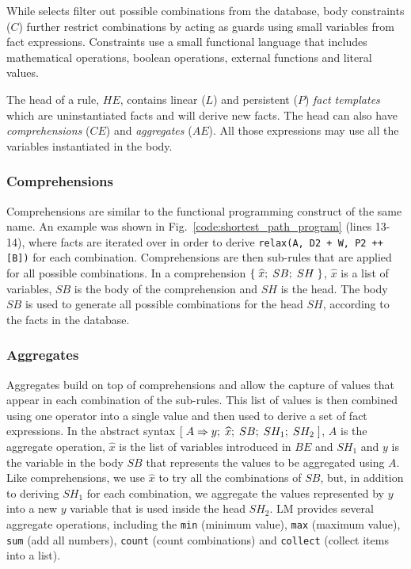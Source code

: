 While selects filter out possible combinations from the database,
body constraints ($C$) further restrict combinations by acting as guards using
small variables from fact expressions. Constraints use a small
functional language that includes mathematical
operations, boolean operations, external functions and literal values.

The head of a rule, $HE$, contains linear ($L$) and persistent ($P$) \emph{fact
   templates} which are uninstantiated facts and will derive new facts. The head
   can also have \emph{comprehensions} ($CE$) and \emph{aggregates} ($AE$). All
   those expressions may use all the variables instantiated in the body.

\subsubsection{Comprehensions}

Comprehensions are similar to the functional programming construct of the same
name. An example was shown in Fig.~\ref{code:shortest_path_program} (lines
      13-14), where  facts are iterated over in order
to derive \texttt{relax(A, D2 + W, P2 ++ [B])} for each combination.
Comprehensions are then sub-rules that are applied for all possible
combinations. In a comprehension $\{ \; \widehat{x}; \; SB; \; SH \; \}$,
$\widehat{x}$ is a list of variables, $SB$ is the body of the comprehension and
$SH$ is the head. The body $SB$ is used to generate all possible combinations
for the head $SH$, according to the facts in the database.

\subsubsection{Aggregates}

Aggregates build on top of comprehensions and allow the capture of values that
appear in each combination of the sub-rules. This list of values is then
combined using one operator into a single value and then used to derive a set of
fact expressions. In the abstract syntax
$[\; A \Rightarrow y; \; \widehat{x}; \; SB; \; SH_1; \; SH_2 \;]$, $A$ is the aggregate operation,
$\widehat{x}$ is the list of variables introduced in $BE$ and $SH_1$ and $y$ is
the variable in the body $SB$ that represents the values to be aggregated using
$A$. Like comprehensions, we use $\widehat{x}$ to try all the combinations of
$SB$, but, in addition to deriving $SH_1$ for each combination, we aggregate the
values represented by $y$ into a new $y$ variable that is used inside the head
$SH_2$.  LM provides several aggregate operations, including the \texttt{min}
(minimum value), \texttt{max} (maximum value), \texttt{sum} (add all numbers),
\texttt{count} (count combinations) and \texttt{collect} (collect items into a
list).

